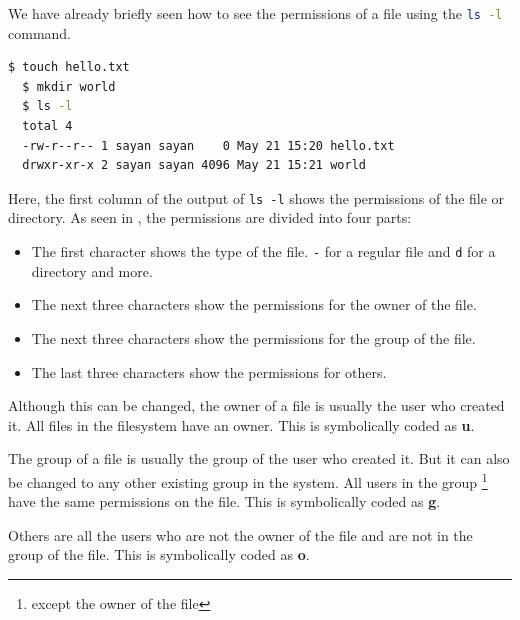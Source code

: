 We have already briefly seen how to see the permissions of a file using the \lstinline[language=bash]{ls -l} command.

\begin{lstlisting}[language=bash]
  $ touch hello.txt
  $ mkdir world
  $ ls -l
  total 4
  -rw-r--r-- 1 sayan sayan    0 May 21 15:20 hello.txt
  drwxr-xr-x 2 sayan sayan 4096 May 21 15:21 world
\end{lstlisting}

Here, the first column of the output of \texttt{ls -l} shows the permissions of the file or directory.
As seen in , the permissions are divided into four parts:

\begin{itemize}
  \item The first character shows the type of the file. \texttt{-} for a regular file and \texttt{d} for a directory and more.
  \item The next three characters show the permissions for the owner of the file.
  \item The next three characters show the permissions for the group of the file.
  \item The last three characters show the permissions for others.
\end{itemize}

\begin{definition}[Owner]
  Although this can be changed, the owner of a file is usually the user who created it.
  All files in the filesystem have an owner.
  This is symbolically coded as \textbf{u}.
\end{definition}

\begin{definition}[Group]
  The group of a file is usually the group of the user who created it.
  But it can also be changed to any other existing group in the system.
  All users in the group
  \footnote{
    except the owner of the file
  }
  have the same permissions on the file.
  This is symbolically coded as \textbf{g}.
\end{definition}

\begin{definition}[Others]
  Others are all the users who are not the owner of the file and are not in the group of the file.
  This is symbolically coded as \textbf{o}.
\end{definition}

